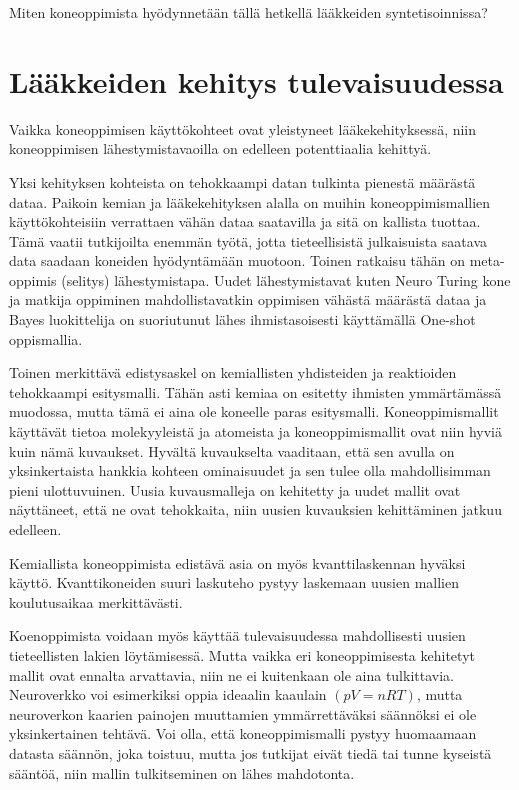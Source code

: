 \documentclass[finnish,twoside,censored,tkt,sw-line]{HYthesisML}
\begin{document}
Miten koneoppimista hyödynnetään tällä hetkellä lääkkeiden syntetisoinnissa?~\cite{SeglerMarwinHS2018Pcsw,ShaharHarelAndKiraRadinsky,ShinBonggun}

\chapter{Lääkkeiden kehitys tulevaisuudessa}

Vaikka koneoppimisen käyttökohteet ovat yleistyneet lääkekehityksessä, niin koneoppimisen lähestymistavaoilla on edelleen potenttiaalia kehittyä.~\cite{ButlerKeithT2018Mlfm}

Yksi kehityksen kohteista on tehokkaampi datan tulkinta pienestä määrästä dataa.
Paikoin kemian ja lääkekehityksen alalla on muihin koneoppimismallien käyttökohteisiin verrattaen vähän dataa saatavilla ja sitä on kallista tuottaa.
Tämä vaatii tutkijoilta enemmän työtä, jotta tieteellisistä julkaisuista saatava data saadaan koneiden hyödyntämään muotoon.
Toinen ratkaisu tähän on meta-oppimis (selitys) lähestymistapa.
Uudet lähestymistavat kuten Neuro Turing kone ja matkija oppiminen mahdollistavatkin oppimisen vähästä määrästä dataa ja Bayes luokittelija on suoriutunut lähes ihmistasoisesti käyttämällä One-shot oppismallia.

Toinen merkittävä edistysaskel on kemiallisten yhdisteiden ja reaktioiden tehokkaampi esitysmalli.
Tähän asti kemiaa on esitetty ihmisten ymmärtämässä muodossa, mutta tämä ei aina ole koneelle paras esitysmalli.
Koneoppimismallit käyttävät tietoa molekyyleistä ja atomeista ja koneoppimismallit ovat niin hyviä kuin nämä kuvaukset.
Hyvältä kuvaukselta vaaditaan, että sen avulla on yksinkertaista hankkia kohteen ominaisuudet ja sen tulee olla mahdollisimman pieni ulottuvuinen.
Uusia kuvausmalleja on kehitetty ja uudet mallit ovat näyttäneet, että ne ovat tehokkaita, niin uusien kuvauksien kehittäminen jatkuu edelleen.

Kemiallista koneoppimista edistävä asia on myös kvanttilaskennan hyväksi käyttö.
Kvanttikoneiden suuri laskuteho pystyy laskemaan uusien mallien koulutusaikaa merkittävästi.

Koenoppimista voidaan myös käyttää tulevaisuudessa mahdollisesti uusien tieteellisten lakien löytämisessä.
Mutta vaikka eri koneoppimisesta kehitetyt mallit ovat ennalta arvattavia, niin ne ei kuitenkaan ole aina tulkittavia.
Neuroverkko voi esimerkiksi oppia ideaalin kaaulain $(pV=nRT)$, mutta neuroverkon kaarien painojen muuttamien ymmärrettäväksi säännöksi ei ole yksinkertainen tehtävä.
Voi olla, että koneoppimismalli pystyy huomaamaan datasta säännön, joka toistuu, mutta jos tutkijat eivät tiedä tai tunne kyseistä sääntöä, niin mallin tulkitseminen on lähes mahdotonta.
\end{document}
